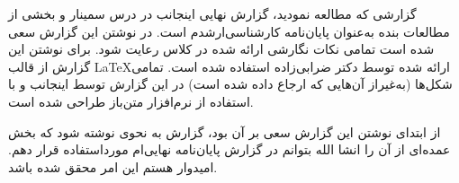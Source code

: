

گزارشی که مطالعه نمودید، گزارش نهایی اینجانب در درس سمینار و بخشی از مطالعات بنده به‌عنوان پایان‌نامه کارشناسی‌ارشدم است. در نوشتن این گزارش سعی شده است تمامی نکات نگارشی ارائه شده در کلاس رعایت شود. برای نوشتن این گزارش از قالب \LaTeX ارائه شده توسط دکتر ضرابی‌زاده استفاده شده است. تمامی شکل‌ها (به‌غیراز آن‌هایی که ارجاع داده شده است) در این گزارش توسط اینجانب و با استفاده از نرم‌افزار متن‌باز  طراحی شده است.

از ابتدای نوشتن این گزارش سعی بر آن بود، گزارش به نحوی نوشته شود که بخش عمده‌ای از آن را انشا الله بتوانم در گزارش پایان‌نامه نهایی‌ام مورداستفاده قرار دهم. امیدوار هستم این امر محقق شده باشد.

